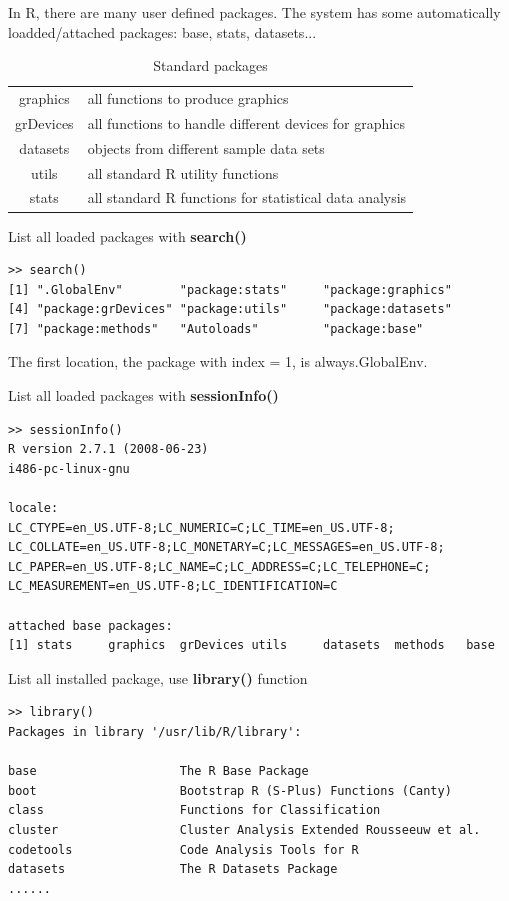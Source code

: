 In R, there are many user defined packages. The system has some
automatically loadded/attached packages: base, stats, datasets...
\begin{table}
\begin{center}
  \begin{tabular}{cl}
    graphics & all functions to produce graphics \\
    grDevices & all functions to handle different devices for graphics
    \\
    datasets & objects from different sample data sets \\
    utils  & all standard R utility functions \\
    stats & all standard R functions for statistical data analysis \\
  \end{tabular}
\end{center}
\caption{Standard packages}
\end{table}


\textbullet List all loaded packages with {\bf search()}
\begin{lstlisting}
>> search() 
[1] ".GlobalEnv"        "package:stats"     "package:graphics" 
[4] "package:grDevices" "package:utils"     "package:datasets" 
[7] "package:methods"   "Autoloads"         "package:base" 
\end{lstlisting}
The first location, the package with index = 1, is always.GlobalEnv.

\textbullet List all loaded packages with {\bf sessionInfo()}
\begin{lstlisting}
>> sessionInfo()
R version 2.7.1 (2008-06-23) 
i486-pc-linux-gnu 

locale:
LC_CTYPE=en_US.UTF-8;LC_NUMERIC=C;LC_TIME=en_US.UTF-8;
LC_COLLATE=en_US.UTF-8;LC_MONETARY=C;LC_MESSAGES=en_US.UTF-8;
LC_PAPER=en_US.UTF-8;LC_NAME=C;LC_ADDRESS=C;LC_TELEPHONE=C;
LC_MEASUREMENT=en_US.UTF-8;LC_IDENTIFICATION=C 

attached base packages:
[1] stats     graphics  grDevices utils     datasets  methods   base 
\end{lstlisting}

\textbullet List all installed package, use {\bf library()} function
\begin{lstlisting}
>> library()
Packages in library '/usr/lib/R/library':

base                    The R Base Package
boot                    Bootstrap R (S-Plus) Functions (Canty)
class                   Functions for Classification
cluster                 Cluster Analysis Extended Rousseeuw et al.
codetools               Code Analysis Tools for R
datasets                The R Datasets Package
......
\end{lstlisting}

